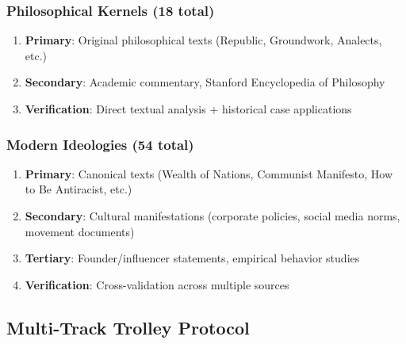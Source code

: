 \documentclass[11pt,a4paper]{article}
\theoremstyle{definition}
\theoremstyle{remark}
\begin{document}
\subsubsection{Philosophical Kernels (18 total)}
\begin{enumerate}
    \item \textbf{Primary}: Original philosophical texts (Republic, Groundwork, Analects, etc.)
    \item \textbf{Secondary}: Academic commentary, Stanford Encyclopedia of Philosophy
    \item \textbf{Verification}: Direct textual analysis + historical case applications
\end{enumerate}

\subsubsection{Modern Ideologies (54 total)}
\begin{enumerate}
    \item \textbf{Primary}: Canonical texts (Wealth of Nations, Communist Manifesto, How to Be Antiracist, etc.)
    \item \textbf{Secondary}: Cultural manifestations (corporate policies, social media norms, movement documents)
    \item \textbf{Tertiary}: Founder/influencer statements, empirical behavior studies
    \item \textbf{Verification}: Cross-validation across multiple sources
\end{enumerate}

\subsection{Multi-Track Trolley Protocol}
\end{document}

